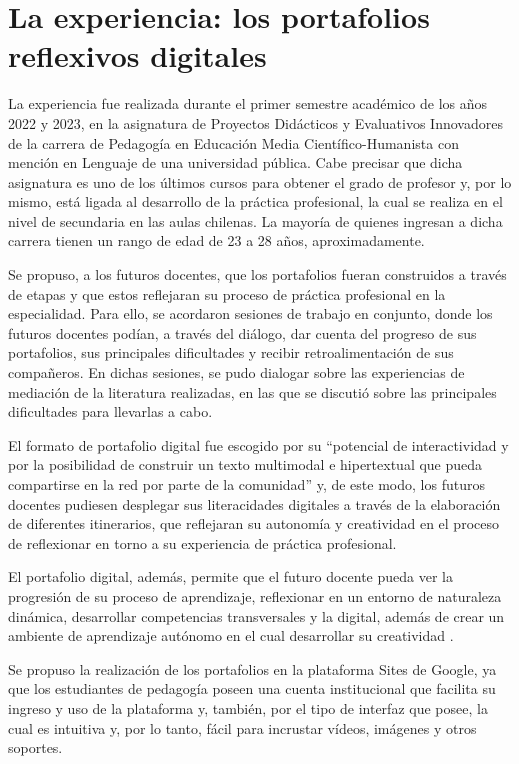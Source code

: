 \section{La experiencia: los portafolios reflexivos digitales}\label{sec-laexperiencialos.tex}
	
La experiencia fue realizada durante el primer semestre académico de los
años 2022 y 2023, en la asignatura de Proyectos Didácticos y Evaluativos
Innovadores de la carrera de Pedagogía en Educación Media
Científico-Humanista con mención en Lenguaje de una universidad pública.
Cabe precisar que dicha asignatura es uno de los últimos cursos para
obtener el grado de profesor y, por lo mismo, está ligada al desarrollo
de la práctica profesional, la cual se realiza en el nivel de secundaria
en las aulas chilenas. La mayoría de quienes ingresan a dicha carrera
tienen un rango de edad de 23 a 28 años, aproximadamente.

Se propuso, a los futuros docentes, que los portafolios fueran
construidos a través de etapas y que estos reflejaran su proceso de
práctica profesional en la especialidad. Para ello, se acordaron
sesiones de trabajo en conjunto, donde los futuros docentes podían, a
través del diálogo, dar cuenta del progreso de sus portafolios, sus
principales dificultades y recibir retroalimentación de sus compañeros.
En dichas sesiones, se pudo dialogar sobre las experiencias de mediación
de la literatura realizadas, en las que se discutió sobre las
principales dificultades para llevarlas a cabo.

El formato de portafolio digital fue escogido por su ``potencial de
interactividad y por la posibilidad de construir un texto multimodal e
hipertextual que pueda compartirse en la red por parte de la comunidad''
\cite[p. 15]{gonzalezmontmany2019} y, de este modo, los futuros docentes
pudiesen desplegar sus literacidades digitales a través de la
elaboración de diferentes itinerarios, que reflejaran su autonomía y
creatividad en el proceso de reflexionar en torno a su experiencia de
práctica profesional.

El portafolio digital, además, permite que el futuro docente pueda ver
la progresión de su proceso de aprendizaje, reflexionar en un entorno de
naturaleza dinámica, desarrollar competencias transversales y la
digital, además de crear un ambiente de aprendizaje autónomo en el cual
desarrollar su creatividad \cite{pujola_suarez_2019}.

Se propuso la realización de los portafolios en la plataforma Sites de
Google, ya que los estudiantes de pedagogía poseen una cuenta
institucional que facilita su ingreso y uso de la plataforma y, también,
por el tipo de interfaz que posee, la cual es intuitiva y, por lo tanto,
fácil para incrustar vídeos, imágenes y otros soportes.~

